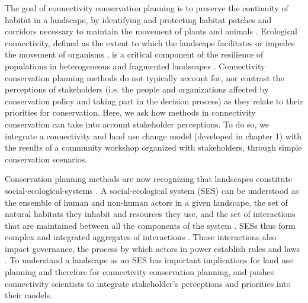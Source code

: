 
The goal of connectivity conservation planning is to preserve the continuity of habitat in a landscape, by identifying and protecting habitat patches and corridors necessary to maintain the movement of plants and animals \citep{keeley_thirty_2019}. Ecological connectivity, defined as the extent to which the landscape facilitates or impedes the movement of organisms \citep{crooks_landscape_2006}, is a critical component of the resilience of populations in heterogeneous and fragmented landscapes \citep{gonzalez_spatial_2017}. Connectivity conservation planning methods do not typically account for, nor contrast the perceptions of stakeholders (i.e. the people and organizations affected by conservation policy and taking part in the decision process) as they relate to  their priorities for conservation. Here, we ask how methods in connectivity conservation can take into account stakeholder perceptions. To do so, we integrate a connectivity and land use change model (developed in chapter 1) with the results of a community workshop organized with stakeholders, through simple conservation scenarios.

Conservation planning methods are now recognizing that landscapes constitute social-ecological-systems \citep{southern_sustainable_2011, martin-lopez_delineating_2017}. A social-ecological system (SES) can be understood as the ensemble of human and non-human actors in a given landscape, the set of natural habitats they inhabit and resources they use, and the set of interactions that are maintained between all the components of the system \citep{ostrom_general_2009}. SESs thus form complex and integrated aggregates of interactions \citep{hinkel_enhancing_2014}. Those interactions also impact governance, the process by which actors in power establish rules and laws \citep{bissonnette_comparing_2018}. To understand a landscape as an SES has important implications for land use planning and therefore for connectivity conservation planning, and pushes connectivity scientists to integrate stakeholder’s perceptions and priorities into their models. 

